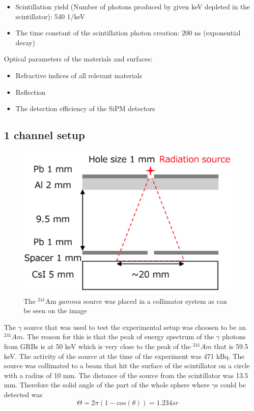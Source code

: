 \documentclass[12pt, a4paper,titlepage]{article}
\numberwithin{equation}{section}
\numberwithin{figure}{section}
\begin{document}
\begin{itemize}
\item Scintillation yield (Number of photons produced by given keV depleted in the scintillator): 540 1/keV
\item The time constant of the scintillation photon creation: 200 ns (exponential decay)
\end{itemize}

Optical parameters of the materials and surfaces:
\begin{itemize}
\item Refractive indices of all relevant materials
\item Reflection
\item The detection efficiency of the SiPM detectors
\end{itemize}

\subsection{1 channel setup}

\begin{figure}
\includegraphics[width=150.0mm]{images/irradiation.png}
\caption{The $^{241}$Am $gamma$ source was placed in a collimator system as can be seen on the image}
\end{figure}

The $\gamma$ source that was used to test the experimental setup was choosen to be an $^{241}Am$. The reason for this is that the peak of energy spectrum of the $\gamma$ photons from GRBs is at 50 keV which is very close to the peak of the $^{241}Am$ that is 59.5 keV. The activity of the source at the time of the experiment was 471 kBq. The source was collimated to a beam that hit the surface of the scintillator on a circle with a radius of 10 mm. The distance of the source from the scintillator was 13.5 mm. Therefore the solid angle of the part of the whole sphere where $\gamma$s could be detected was 
$$\Theta = 2 \pi (1-cos(\theta)) = 1.234 sr$$
\end{document}
